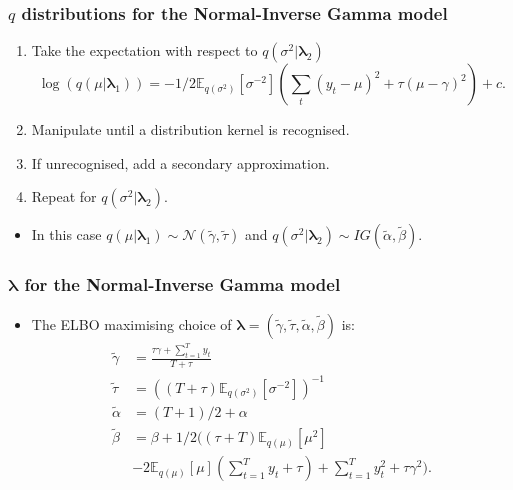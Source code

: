 \documentclass{beamer}\usepackage[]{graphicx}\usepackage[]{color}
\newcounter{saveenumi}
\newcommand{\conti}{\setcounter{enumi}{\value{saveenumi}}}
\begin{document}
\begin{frame}
\frametitle{$q$ distributions for the Normal-Inverse Gamma model}
\begin{enumerate}
\conti
\item Take the expectation with respect to $q(\sigma^2 | \boldsymbol{\lambda}_2)$
\begin{equation}
\log(q(\mu | \boldsymbol{\lambda}_1)) = - 1/2 \mathbb{E}_{q(\sigma^2)} [\sigma^{-2}] \left( \sum_{t}(y_t - \mu)^2 + \tau(\mu - \gamma)^2 \right)  + c. \nonumber
\end{equation}
\item Manipulate until a distribution kernel is recognised. 
\item If unrecognised, add a secondary approximation.
\item Repeat for $q(\sigma^2 | \boldsymbol{\lambda}_2)$.
\end{enumerate}
\begin{itemize}
\item In this case $q(\mu | \boldsymbol{\lambda}_1) \sim \mathcal{N}(\tilde{\gamma}, \tilde{\tau})$ and $q(\sigma^2 | \boldsymbol{\lambda}_2) \sim IG(\tilde{\alpha}, \tilde{\beta})$.
\end{itemize}
\end{frame}


\begin{frame}
\frametitle{$\boldsymbol{\lambda}$ for the Normal-Inverse Gamma model}
\begin{itemize}
\item The ELBO maximising choice of $\boldsymbol{\lambda} = (\tilde{\gamma}, \tilde{\tau}, \tilde{\alpha}, \tilde{\beta})$ is:
\begin{align}
\tilde{\gamma} &= \frac{\tau \gamma + \sum_{t=1}^{T} y_t}{T + \tau}  \label{mf5} \\ 
\tilde{\tau} &= \left((T + \tau)\mathbb{E}_{q(\sigma^2)}[\sigma^{-2}]\right )^{-1} \label{mf6} \\
\tilde{\alpha} &= (T+1)/2 + \alpha  \label{mf7} \\
\tilde{\beta} &= \beta + 1/2\bigg((\tau + T)\mathbb{E}_{q(\mu)}[\mu^2 ]  \nonumber \\ 
&- 2 \mathbb{E}_{q(\mu)}[\mu ]\left(\sum_{t=1}^{T}y_t + \tau\right) + \sum_{t=1}^{T} y_t^2 + \tau \gamma^2 \bigg). \label{mf8}
\end{align}
\end{itemize}
\end{frame}
\end{document}
